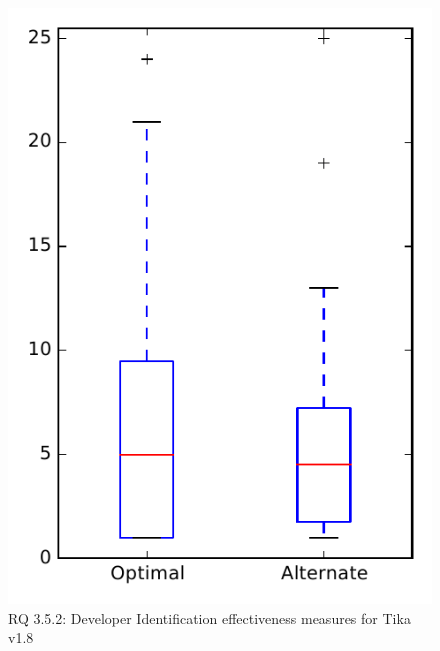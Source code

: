
\begin{figure}
\centering
\includegraphics[height=0.4\textheight]{figures/combo/dit_rq2_tika}
\caption{RQ 3.5.2: Developer Identification effectiveness measures for Tika v1.8}
\label{fig:dit:rq2:tika}
\end{figure}
